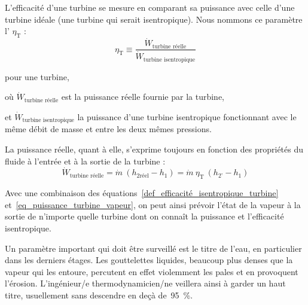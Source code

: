 		L’efficacité d’une turbine se mesure en comparant sa puissance avec celle d’une turbine idéale (une turbine qui serait isentropique). Nous nommons ce paramètre l’ $\eta_\text{T}$ :
		\begin{equation}
			\eta_\text{T} \equiv  \frac{\dot{W}_\text{turbine réelle}}{\dot{W}_\text{turbine isentropique}}
			\label{def_efficacité_isentropique_turbine}
		\end{equation}
		
		\begin{equationterms}
			\item pour une turbine,
			\item où \tab $\dot{W}_\text{turbine réelle}$ 			\tab\tab\tab\tab\tab est la puissance réelle fournie par la turbine,
			\item et \tab $\dot{W}_\text{turbine isentropique}$ 	\tab la puissance d’une turbine isentropique fonctionnant avec le même débit de masse et entre les deux mêmes pressions.
		\end{equationterms}

		La puissance réelle, quant à elle, s’exprime toujours en fonction des propriétés du fluide à l’entrée et à la sortie de la turbine :
		\begin{equation}
			\dot{W}_\text{turbine réelle} = \dot{m} \ (h_{2 \text{réel}} - h_1) = \dot m \ \eta_\text{T} \ (h_{2’} - h_1)
			\label{eq_puissance_turbine_vapeur}
		\end{equation}

		Avec une combinaison des équations~\ref{def_efficacité_isentropique_turbine} et~\ref{eq_puissance_turbine_vapeur}, on peut ainsi prévoir l’état de la vapeur à la sortie de n’importe quelle turbine dont on connaît la puissance et l’efficacité isentropique.

		Un paramètre important qui doit être surveillé est le titre de l’eau, en particulier dans les derniers étages. Les gouttelettes liquides, beaucoup plus denses que la vapeur qui les entoure, percutent en effet violemment les pales et en provoquent l’érosion. L’ingénieur/e thermodynamicien/ne veillera ainsi à garder un haut titre, usuellement sans descendre en deçà de~\SI{95}{\percent}.

